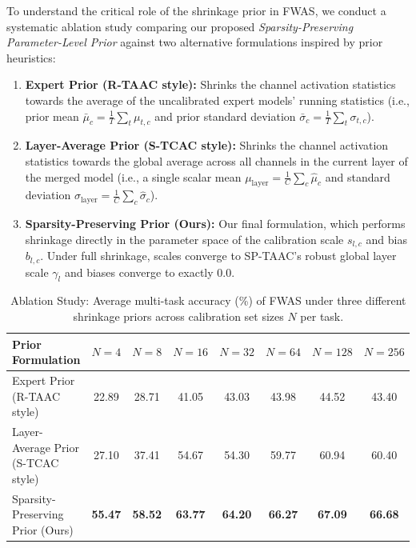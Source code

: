 \documentclass{article}
\theoremstyle{plain}
\theoremstyle{definition}
\theoremstyle{remark}
\begin{document}
To understand the critical role of the shrinkage prior in FWAS, we conduct a systematic ablation study comparing our proposed \textit{Sparsity-Preserving Parameter-Level Prior} against two alternative formulations inspired by prior heuristics:
\begin{enumerate}
    \item \textbf{Expert Prior (R-TAAC style):} Shrinks the channel activation statistics towards the average of the uncalibrated expert models' running statistics (i.e., prior mean $\bar{\mu}_c = \frac{1}{T}\sum_{t}\mu_{t,c}$ and prior standard deviation $\bar{\sigma}_c = \frac{1}{T}\sum_{t}\sigma_{t,c}$).
    \item \textbf{Layer-Average Prior (S-TCAC style):} Shrinks the channel activation statistics towards the global average across all channels in the current layer of the merged model (i.e., a single scalar mean $\mu_{\text{layer}} = \frac{1}{C}\sum_{c}\hat{\mu}_{c}$ and standard deviation $\sigma_{\text{layer}} = \frac{1}{C}\sum_{c}\hat{\sigma}_{c}$).
    \item \textbf{Sparsity-Preserving Prior (Ours):} Our final formulation, which performs shrinkage directly in the parameter space of the calibration scale $s_{l,c}$ and bias $b_{l,c}$. Under full shrinkage, scales converge to SP-TAAC's robust global layer scale $\gamma_l$ and biases converge to exactly $0.0$.
\end{enumerate}

\begin{table}[ht]
\centering
\caption{Ablation Study: Average multi-task accuracy (\%) of FWAS under three different shrinkage priors across calibration set sizes $N$ per task.}
\label{tab:ablation_priors}
\vskip 0.15in
\begin{small}
\begin{sc}
\begin{tabular}{lccccccc}
\toprule
Prior Formulation & $N=4$ & $N=8$ & $N=16$ & $N=32$ & $N=64$ & $N=128$ & $N=256$ \\
\midrule
Expert Prior (R-TAAC style)         & 22.89 & 28.71 & 41.05 & 43.03 & 43.98 & 44.52 & 43.40 \\
Layer-Average Prior (S-TCAC style)  & 27.10 & 37.41 & 54.67 & 54.30 & 59.77 & 60.94 & 60.40 \\
Sparsity-Preserving Prior (Ours)    & \textbf{55.47} & \textbf{58.52} & \textbf{63.77} & \textbf{64.20} & \textbf{66.27} & \textbf{67.09} & \textbf{66.68} \\
\bottomrule
\end{tabular}
\end{sc}
\end{small}
\vskip -0.1in
\end{table}
\end{document}
